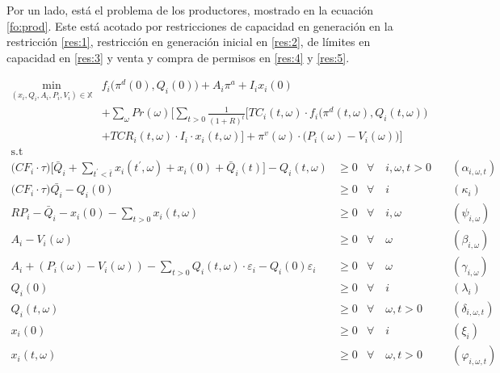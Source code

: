 Por un lado, está el problema de los productores, mostrado en la ecuación \ref{fo:prod}. Este está acotado por restricciones de capacidad en generación en la restricción \ref{res:1}, restricción en generación inicial en \ref{res:2}, de límites en capacidad en \ref{res:3} y venta y compra de permisos en \ref{res:4} y \ref{res:5}. 

\begin{align}
\min_{(x_i,Q_i,A_i,P_i,V_i)\in \mathbb{X}} &  f_i \big( \pi^d(0),Q_i(0)\big)+ A_i \pi^{a} + I_i x_i(0) \nonumber \\ 
& + \sum_{\omega} Pr(\omega)   \Bigg[ \sum_{t>0} \frac{1}{(1+R)^t} \Big[ TC_i(t,\omega)\cdot f_i \big( \pi^d(t,\omega),Q_i(t,\omega) \big)  \nonumber \\
 & + TCR_i(t,\omega) \cdot I_i\cdot x_i(t,\omega) \Big] + \pi^v(\omega)\cdot \big(P_i(\omega)-V_i(\omega)\big) \Bigg]  \label{fo:prod}\\
     \textrm{s.t \ } \nonumber
\end{align}
\begin{align}
    \Big(CF_i \cdot\tau\Big)  \Bigg[\bar{Q}_i + \sum_{t^{\prime}<\bar{t}} x_i(t^\prime,\omega) + x_i(0)+ \bar{Q}_i(t) \Bigg] - Q_i(t,\omega) & \geq 0  & \forall  \quad i,\omega, t  > 0 & \quad (\alpha_{i,\omega,t})\label{res:1}\\
    \Big(CF_i\cdot\tau \Big)\bar{Q_i}-Q_{i}(0) & \geq 0  & \forall  \quad i & \quad (\kappa_i) \label{res:2}\\
     RP_i - \bar{Q}_i  - x_i(0) - \sum_{t > 0} x_i(t,\omega) & \geq 0 &  \forall \quad i,\omega &   \quad (\psi_{i,\omega}) \label{res:3}\\
 A_{i} -V_i(\omega) & \geq  0  & \forall  \quad \omega & \quad (\beta_{i,\omega}) \label{res:4}\\
 A_{i} + (P_i(\omega) - V_i(\omega))-\sum_{t>0}Q_i(t, \omega)\cdot \varepsilon_{i}-Q_i(0)\varepsilon_{i} & \geq  0  &\forall \quad \omega & \quad (\gamma_{i,\omega})\label{res:5}\\
 Q_i(0) & \geq  0 & \forall \quad i & \quad (\lambda_i) \label{res:q0}\\ 
 Q_i(t, \omega) & \geq  0   & \forall \quad \omega, t >0 & \quad (\delta_{i,\omega,t})\label{res:qt}\\
  x_i(0) & \geq  0 & \forall  \quad i & \quad (\xi_i)  \label{res:capi0}\\ 
  x_i(t, \omega) & \geq  0   & \forall  \quad \omega, t >0 & \quad (\varphi_{i,\omega,t})\label{res:capt}
  \end{align}

